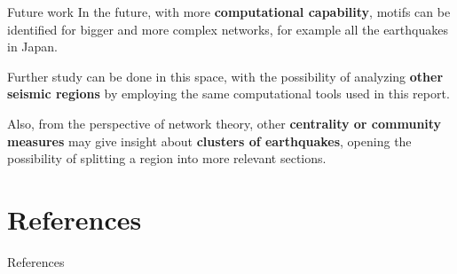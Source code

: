\documentclass[10pt]{beamer}
\begin{document}
\begin{frame}{Future work}
In the future, with more {\bf computational capability}, motifs can be identified for bigger and more complex networks, for example all the earthquakes in Japan. \par 

\vspace{5mm} 

Further study can be done in this space, with the possibility of analyzing {\bf other seismic regions} by employing the same computational tools used in this report. \par

\vspace{5mm} 

Also, from the perspective of network theory, other {\bf centrality or community measures} may give insight about {\bf clusters of earthquakes}, opening the possibility of splitting a region into more relevant sections. 
\end{frame}


\section{References}		
\begin{frame}[allowframebreaks]{References}




\end{frame}
\end{document}
